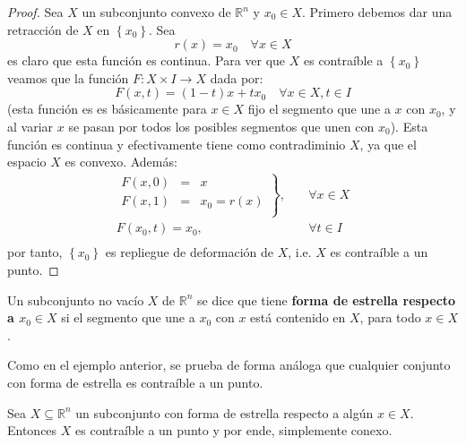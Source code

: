 \documentclass[12pt]{report}
\theoremstyle{largebreak}
\newcommand\cf[3]{\ensuremath{#1:#2\rightarrow#3}}
\begin{document}
    \begin{proof}
        Sea $X$ un subconjunto convexo de $\mathbb{R}^n$ y $x_0\in X$. Primero debemos dar una retracción de $X$ en $\left\{ x_0\right\}$. Sea
        \begin{equation*}
            r(x)=x_0\quad\forall x\in X
        \end{equation*}
        es claro que esta función es continua. Para ver que $X$ es contraíble a $\left\{x_0\right\}$ veamos que la función $\cf{F}{X\times I}{X}$ dada por:
        \begin{equation*}
            F(x,t)=(1-t)x+tx_0\quad\forall x\in X,t\in I
        \end{equation*}
        (esta función es es básicamente para $x\in X$ fijo el segmento que une a $x$ con $x_0$, y al variar $x$ se pasan por todos los posibles segmentos que unen con $x_0$). Esta función es continua y efectivamente tiene como contradiminio $X$, ya que el espacio $X$ es convexo. Además:
        \begin{equation*}
            \begin{split}
                \left.
                    \begin{array}{rcl}
                        F(x,0) & = & x \\
                        F(x,1) & = & x_0 = r(x) \\
                    \end{array}
                \right\},\quad&\forall x\in X\\
                F(x_0,t)=x_0,\quad&\forall t\in I\\
            \end{split}
        \end{equation*}
        por tanto, $\left\{x_0\right\}$ es repliegue de deformación de $X$, i.e. $X$ es contraíble a un punto.
    \end{proof}

    \begin{mydef}
        Un subconjunto no vacío $X$ de $\mathbb{R}^n$ se dice que tiene \textbf{forma de estrella respecto a $x_0\in X$} si el segmento que une a $x_0$ con $x$ está contenido en $X$, para todo $x\in X$.
    \end{mydef}    

    Como en el ejemplo anterior, se prueba de forma análoga que cualquier conjunto con forma de estrella es contraíble a un punto.

    \begin{propo}
        Sea $X\subseteq\mathbb{R}^n$ un subconjunto con forma de estrella respecto a algún $x\in X$. Entonces $X$ es contraíble a un punto y por ende, simplemente conexo.
    \end{propo}
\end{document}
